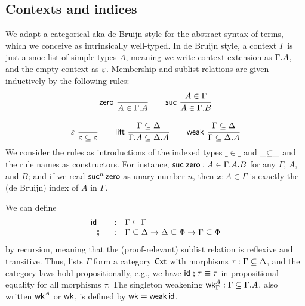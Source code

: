 \documentclass[sigplan,screen,fleqn]{acmart}
\begin{document}
\subsection{Contexts and indices}

We adapt a categorical aka de Bruijn style for the abstract syntax of
terms, which we conceive as intrinsically well-typed.  In de Bruijn
style, a context $\Gamma$ is just a snoc list of simple types $A$,
meaning we write context extension as $\Gamma.A$, and the empty
context as $\varepsilon$.  Membership  and sublist
relations \fbox{$\Gamma \sublist \Delta$} are given inductively by the
following rules:
\begin{gather*}
  \nru{\tzero}{}{A \in \cext \Gamma A}
\qquad
  \nru{\tsuc}{A \in \Gamma}{A \in \cext \Gamma B}
\\[2ex]
  \nru{\tdone}{}{\cempty \sublist \cempty}
\qquad
  \nru{\tlift}
    {\Gamma \sublist \Delta}
    {\cext \Gamma A \sublist \cext \Delta A}
\qquad
  \nru{\tweak}
    {\Gamma \sublist \Delta}
    {\Gamma \sublist \cext \Delta A}
\end{gather*}
We consider the rules as introductions of the indexed types
$\_{\in}\_$ and $\_{\subseteq}\_$ and the rule names as constructors.
For instance, $\mathsf{\mathsf{suc}\;\mathsf{zero}} : A \in \Gamma.A.B$ for any
$\Gamma$, $A$, and $B$; and if we read $\mathsf{suc}^n\,\mathsf{zero}$ as unary
number $n$, then $x : A \in \Gamma$ is exactly the (de Bruijn) index
of $A$ in $\Gamma$.

We can define
\[
\begin{array}{lcl}
\mathsf{id} & : & \Gamma \subseteq \Gamma
\\
\_{\fatsemi}\_ & : & \Gamma
\subseteq \Delta \to \Delta \subseteq \Phi \to \Gamma \subseteq \Phi
\end{array}
\]
by recursion, meaning that the (proof-relevant)
sublist relation is reflexive and transitive.
Thus, lists $\Gamma$ form a category
$\mathsf{Cxt}$ with morphisms $\tau : \Gamma \subseteq \Delta$, and the category laws
hold propositionally, e.g., we have $\mathsf{id}_{} \fatsemi \tau \equiv \tau$ in
propositional equality for all morphisms $\tau$.
The singleton weakening $\mathsf{wk}^A_\Gamma : \Gamma \subseteq \Gamma.A$,
also written $\mathsf{wk}^A$ or $\mathsf{wk}$, is defined by $\mathsf{wk} = \mathsf{weak}\,\mathsf{id}$.
\end{document}
